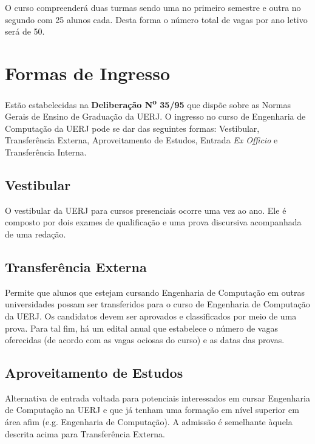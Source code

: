 O curso compreenderá duas turmas sendo uma no primeiro semestre e outra no segundo com 25 alunos cada. Desta forma o número total de vagas por ano letivo será de 50.


\section{Formas de Ingresso}
\label{sec:forma-ingresso}
Estão estabelecidas na \textbf{Deliberação N\textsuperscript{o} 35/95} que dispõe sobre as Normas Gerais de Ensino de Graduação da UERJ. O ingresso no curso de Engenharia de Computação da UERJ pode se dar das seguintes formas: Vestibular, Transferência Externa, Aproveitamento de Estudos, Entrada \textit{Ex Officio} e Transferência Interna.

\subsection{Vestibular}
O vestibular da UERJ para cursos presenciais ocorre uma vez ao ano. Ele é composto por dois exames de qualificação e uma prova discursiva acompanhada de uma redação.

\subsection{Transferência Externa}
Permite que alunos que estejam cursando Engenharia de Computação em outras universidades possam ser transferidos para o curso de Engenharia de Computação da UERJ. Os candidatos devem ser aprovados e classificados por meio de uma prova. Para tal fim, há um edital anual que estabelece o número de vagas oferecidas (de acordo com as vagas ociosas do curso) e as datas das provas.

\subsection{Aproveitamento de Estudos}
Alternativa de entrada voltada para potenciais interessados em cursar Engenharia de Computação na UERJ e que já tenham uma formação em nível superior em área afim (e.g. Engenharia de Computação). A admissão é semelhante àquela descrita acima para Transferência Externa.

